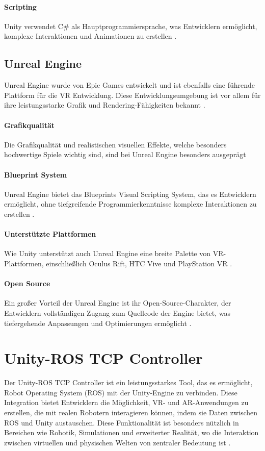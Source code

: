 \paragraph{Scripting}
Unity verwendet C\# als Hauptprogrammiersprache, was Entwicklern ermöglicht, komplexe Interaktionen und Animationen zu erstellen \cite{unity2021}.
\subsection{Unreal Engine}
Unreal Engine wurde von Epic Games entwickelt und ist ebenfalls eine führende Plattform für die VR Entwicklung. Diese Entwicklungsumgebung ist vor allem für ihre leistungsstarke Grafik und Rendering-Fähigkeiten bekannt .
\paragraph{Grafikqualität} Die Grafikqualität und realistischen visuellen Effekte, welche besonders hochwertige Spiele wichtig sind, sind bei Unreal Engine besonders ausgeprägt \cite{epic2021}
\paragraph{Blueprint System} Unreal Engine bietet das Blueprints Visual Scripting System, das es Entwicklern ermöglicht, ohne tiefgreifende Programmierkenntnisse komplexe Interaktionen zu erstellen \cite{epicBlueprints2021}.
\paragraph{Unterstützte Plattformen} Wie Unity unterstützt auch Unreal Engine eine breite Palette von VR-Plattformen, einschließlich Oculus Rift, HTC Vive und PlayStation VR \cite{epic2021}.
\paragraph{Open Source}
Ein großer Vorteil der Unreal Engine ist ihr Open-Source-Charakter, der Entwicklern vollständigen Zugang zum Quellcode der Engine bietet, was tiefergehende Anpassungen und Optimierungen ermöglicht \cite{epic2021}.
\section{Unity-ROS TCP Controller}

Der Unity-ROS TCP Controller ist ein leistungsstarkes Tool, das es ermöglicht, Robot Operating System (ROS) mit der Unity-Engine zu verbinden. Diese Integration bietet Entwicklern die Möglichkeit, VR- und AR-Anwendungen zu erstellen, die mit realen Robotern interagieren können, indem sie Daten zwischen ROS und Unity austauschen. Diese Funktionalität ist besonders nützlich in Bereichen wie Robotik, Simulationen und erweiterter Realität, wo die Interaktion zwischen virtuellen und physischen Welten von zentraler Bedeutung ist \cite{ros_tcp_endpoint,unity_ros_tcp_connector}.

